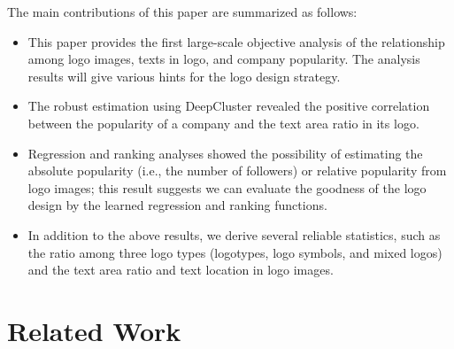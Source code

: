 \documentclass[runningheads]{llncs}
\begin{document}
%
The main contributions of this paper are summarized as follows:
\begin{itemize}
    \item This paper provides the first large-scale objective analysis of the relationship among logo images, texts in logo, and company popularity. The analysis results will give various hints for the logo design strategy.
    \item The robust estimation using DeepCluster revealed the positive correlation between the popularity of a company and the text area ratio in its logo.
    \item Regression and ranking analyses showed the possibility of estimating the absolute popularity (i.e., the number of followers) or relative popularity from logo images; this result suggests we can evaluate the goodness of the logo design by the learned regression and ranking functions.  
    \item In addition to the above results, we derive several reliable statistics, such as the ratio among three logo types (logotypes, logo symbols, and mixed logos) and the text area ratio and text location in logo images. 
\end{itemize}


\section{Related Work}\label{sec:related}
\end{document}
